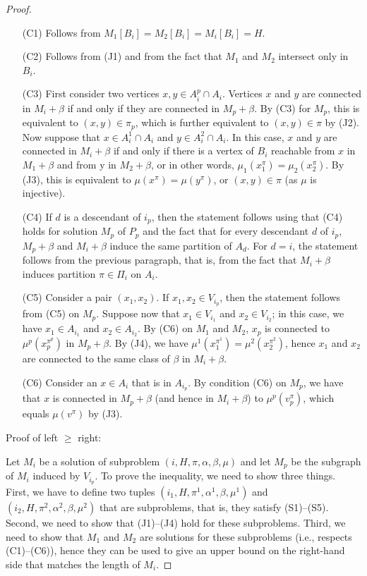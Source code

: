 \begin{proof}
\begin{itemize}
    \item[(C1)] Follows from \(M_1[B_i] = M_2[B_i] = M_i[B_i] = H\).
    \item[(C2)] Follows from (J1) and from the fact that \(M_1\) and \(M_2\) intersect only in \(B_i\).
    \item[(C3)] First consider two vertices \(x, y \in A_i^p \cap A_i\). Vertices \(x\) and \(y\) are connected in \(M_i + \beta\) if and only if they are connected in \(M_p + \beta\). By (C3) for \(M_p\), this is equivalent to \((x, y) \in \pi_p\), which is further equivalent to \((x, y) \in \pi\) by (J2). Now suppose that \(x \in A_i^1 \cap A_i\) and \(y \in A_i^2 \cap A_i\). In this case, \(x\) and \(y\) are connected in \(M_i + \beta\) if and only if there is a vertex of \(B_i\) reachable from \(x\) in \(M_1 + \beta\) and from y in \(M_2 + \beta\), or in other words, \(\mu_1(x^\pi_1) = \mu_2(x^\pi_2)\). By (J3), this is equivalent to \(\mu(x^\pi) = \mu(y^\pi)\), or \((x, y) \in \pi\) (as \(\mu\) is injective).
    \item[(C4)] If \(d\) is a descendant of \(i_p\), then the statement follows using that (C4) holds for solution \(M_p\) of \(P_p\) and the fact that for every descendant \(d\) of \(i_p\), \(M_p + \beta\) and \(M_i + \beta\) induce the same partition of \(A_d\). For \(d = i\), the statement follows from the previous paragraph, that is, from the fact that \(M_i + \beta\) induces partition \(\pi \in \Pi_i\) on \(A_i\).
    \item[(C5)] Consider a pair \((x_1, x_2)\). If \(x_1, x_2 \in V_{i_p}\), then the statement follows from (C5) on \(M_p\). Suppose now that \(x_1 \in V_{i_1}\) and \(x_2 \in V_{i_2}\); in this case, we have \(x_1 \in A_{i_1}\) and \(x_2 \in A_{i_2}\). By (C6) on \(M_1\) and \(M_2\), \(x_p\) is connected to \(\mu^p(x_p^{\pi^p})\) in \(M_p + \beta\). By (J4), we have \(\mu^1(x_1^{\pi^1}) = \mu^2(x_2^{\pi^2})\), hence \(x_1\) and \(x_2\) are connected to the same class of \(\beta\) in \(M_i + \beta\).
    \item[(C6)] Consider an \(x \in A_i\) that is in \(A_{i_p}\). By condition (C6) on \(M_p\), we have that \(x\) is connected in \(M_p + \beta\) (and hence in \(M_i + \beta\)) to \(\mu^p(v^\pi_p)\), which equals \(\mu(v^\pi)\) by (J3).
\end{itemize}


Proof of left \(\geq\) right:

Let \(M_i\) be a solution of subproblem \((i, H, \pi, \alpha, \beta, \mu)\) and let \(M_p\) be the subgraph of \(M_i\) induced by \(V_{i_p}\). To prove the inequality, we need to show three things. First, we have to define two tuples \((i_1, H, \pi^1, \alpha^1,\beta,\mu^1)\) and \((i_2, H, \pi^2, \alpha^2,\beta,\mu^2)\) that are subproblems, that is, they satisfy (S1)–(S5). Second, we need to show that (J1)–(J4) hold for these subproblems. Third, we need to show that \(M_1\) and \(M_2\) are solutions for these subproblems (i.e., respects (C1)–(C6)), hence they can be used to give an upper bound on the right-hand side that matches the length of \(M_i\).


\end{proof}

